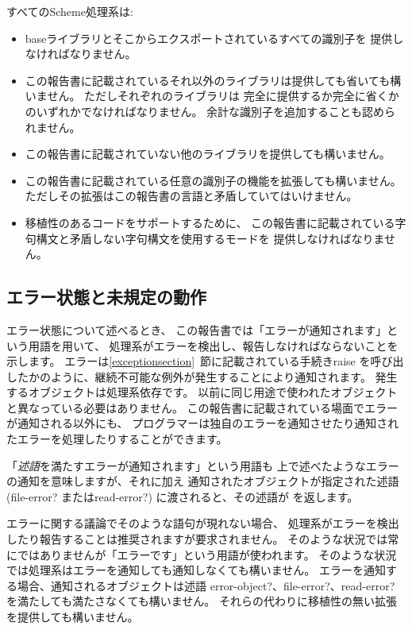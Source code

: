 すべてのScheme処理系は:
\begin{itemize}

\item baseライブラリとそこからエクスポートされているすべての識別子を
提供しなければなりません。

\item この報告書に記載されているそれ以外のライブラリは提供しても省いても構いません。
ただしそれぞれのライブラリは
完全に提供するか完全に省くかのいずれかでなければなりません。
余計な識別子を追加することも認められません。

\item この報告書に記載されていない他のライブラリを提供しても構いません。

\item この報告書に記載されている任意の識別子の機能を拡張しても構いません。
ただしその拡張はこの報告書の言語と矛盾していてはいけません。

\item 移植性のあるコードをサポートするために、
この報告書に記載されている字句構文と矛盾しない字句構文を使用するモードを
提供しなければなりません。
\end{itemize}

\subsection{エラー状態と未規定の動作}
\label{errorsituations}

エラー状態について述べるとき、
この報告書では「エラーが通知されます」という用語を用いて、
処理系がエラーを検出し、報告しなければならないことを示します。
エラーは\ref{exceptionsection}~節に記載されている手続き{\cf raise}
を呼び出したかのように、継続不可能な例外が発生することにより通知されます。
発生するオブジェクトは処理系依存です。
以前に同じ用途で使われたオブジェクトと異なっている必要はありません。
この報告書に記載されている場面でエラーが通知される以外にも、
プログラマーは独自のエラーを通知させたり通知されたエラーを処理したりすることができます。

「{\em 述語}を満たすエラーが通知されます」という用語も
上で述べたようなエラーの通知を意味しますが、それに加え
通知されたオブジェクトが指定された述語({\cf file-error?} または{\cf read-error?})
に渡されると、その述語が \schtrue{} を返します。

\vest エラーに関する議論でそのような語句が現れない場合、
処理系がエラーを検出したり報告することは推奨されますが要求されません。
そのような状況では常にではありませんが「エラーです」という用語が使われます。
そのような状況では処理系はエラーを通知しても通知しなくても構いません。
エラーを通知する場合、通知されるオブジェクトは述語
{\cf error-object?}、{\cf file-error?}、{\cf read-error?} 
を満たしても満たさなくても構いません。
それらの代わりに移植性の無い拡張を提供しても構いません。

